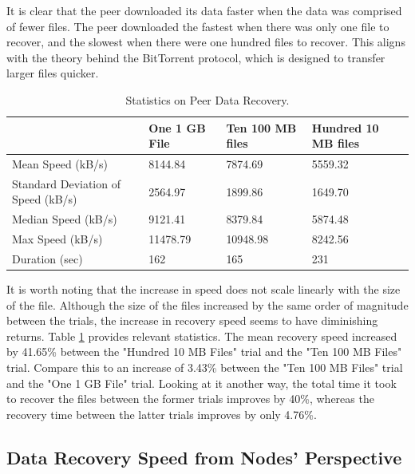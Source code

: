 \documentclass[12pt]{report}
\begin{document}
It is clear that the peer downloaded its data faster when the data was comprised of fewer files. The peer downloaded the fastest when there was only one file to recover, and the slowest when there were one hundred files to recover. This aligns with the theory behind the BitTorrent protocol, which is designed to transfer larger files quicker.

\begin{table}
\begin{adjustwidth}{-.5in}{-.5in}
\centering
    \begin{tabular}{| l | l | l | l |}
    \hline
    & One 1 GB File & Ten 100 MB files & Hundred 10 MB files \\ \hline
    Mean Speed (kB/s)& 8144.84 & 7874.69 & 5559.32 \\ \hline
    Standard Deviation of Speed (kB/s) & 2564.97 & 1899.86 & 1649.70 \\ \hline
    Median Speed (kB/s)& 9121.41 & 8379.84 & 5874.48 \\ \hline
    Max Speed (kB/s) & 11478.79 & 10948.98 & 8242.56 \\ \hline
    Duration (sec) & 162 & 165 & 231 \\ \hline
    \end{tabular}
    \caption{Statistics on Peer Data Recovery.}
    \label{tab:PeerRecoverySpeed}
\end{adjustwidth}
\end{table}

It is worth noting that the increase in speed does not scale linearly with the size of the file. Although the size of the files increased by the same order of magnitude between the trials, the increase in recovery speed seems to have diminishing returns. Table \ref{tab:PeerRecoverySpeed} provides relevant statistics. The mean recovery speed increased by 41.65\% between the "Hundred 10 MB Files" trial and the "Ten 100 MB Files" trial. Compare this to an increase of 3.43\% between the "Ten 100 MB Files" trial and the "One 1 GB File" trial. Looking at it another way, the total time it took to recover the files between the former trials improves by 40\%, whereas the recovery time between the latter trials improves by only 4.76\%.

\subsection{Data Recovery Speed from Nodes' Perspective} \label{subsec:DataRecoverySpeedfromNodesPerspective}
\end{document}

